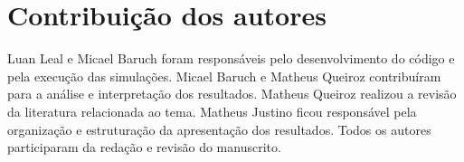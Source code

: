 \section{Contribuição dos autores}

Luan Leal e Micael Baruch foram responsáveis pelo desenvolvimento do código e pela execução das simulações. Micael Baruch e Matheus Queiroz contribuíram para a análise e interpretação dos resultados. Matheus Queiroz realizou a revisão da literatura relacionada ao tema. Matheus Justino ficou responsável pela organização e estruturação da apresentação dos resultados. Todos os autores participaram da redação e revisão do manuscrito.
